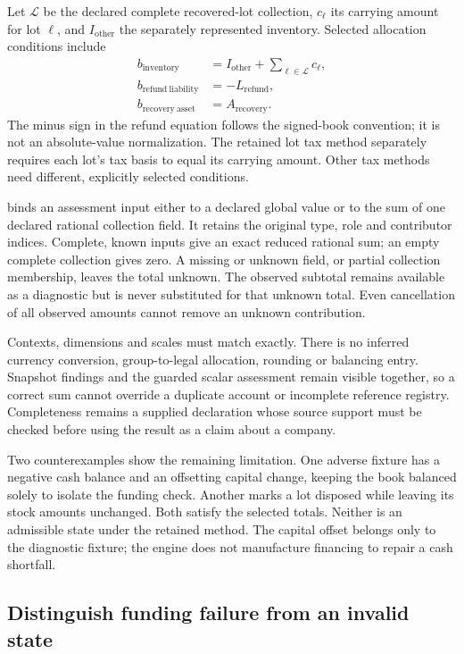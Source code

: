 Let $\mathcal L$ be the declared complete recovered-lot collection, $c_\ell$ its
carrying amount for lot $\ell$, and $I_{\mathrm{other}}$ the separately represented
inventory. Selected allocation conditions include
\begin{align}
 b_{\mathrm{inventory}} &= I_{\mathrm{other}}+
                          \sum_{\ell\in\mathcal L}c_\ell, \\
 b_{\mathrm{refund\ liability}} &= -L_{\mathrm{refund}}, \\
 b_{\mathrm{recovery\ asset}} &= A_{\mathrm{recovery}}.
\end{align}
The minus sign in the refund equation follows the signed-book convention; it
is not an absolute-value normalization. The retained lot tax method separately
requires each lot's tax basis to equal its carrying amount. Other tax methods
need different, explicitly selected conditions.

 binds an assessment input either to a declared
global value or to the sum of one declared rational collection field. It retains
the original type, role and contributor indices. Complete, known inputs give an
exact reduced rational sum; an empty complete collection gives zero. A missing
or unknown field, or partial collection membership, leaves the total unknown.
The observed subtotal remains available as a diagnostic but is never substituted
for that unknown total. Even cancellation of all observed amounts cannot remove
an unknown contribution.

Contexts, dimensions and scales must match exactly. There is no inferred currency
conversion, group-to-legal allocation, rounding or balancing entry. Snapshot
findings and the guarded scalar assessment remain visible together, so a correct
sum cannot override a duplicate account or incomplete reference registry.
Completeness remains a supplied declaration whose source support must be checked
before using the result as a claim about a company.

Two counterexamples show the remaining limitation. One adverse fixture has a
negative cash balance and an offsetting capital change, keeping the book balanced
solely to isolate the funding check. Another marks a lot disposed while leaving
its stock amounts unchanged. Both satisfy the selected totals. Neither is an
admissible state under the retained method. The capital offset belongs only to
the diagnostic fixture; the engine does not manufacture financing to repair a
cash shortfall.

\subsection{Distinguish funding failure from an invalid state}

